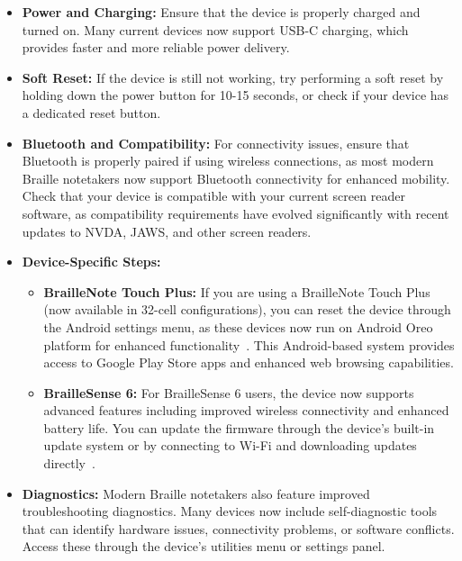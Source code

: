 \begin{itemize}
	\item \textbf{Power and Charging:} Ensure that the device is properly charged and turned on. Many current devices now support USB-C charging, which provides faster and more reliable power delivery.
	\item \textbf{Soft Reset:} If the device is still not working, try performing a soft reset by holding down the power button for 10-15 seconds, or check if your device has a dedicated reset button.
	\item \textbf{Bluetooth and Compatibility:} For connectivity issues, ensure that Bluetooth is properly paired if using wireless connections, as most modern Braille notetakers now support Bluetooth connectivity for enhanced mobility. Check that your device is compatible with your current screen reader software, as compatibility requirements have evolved significantly with recent updates to NVDA, JAWS, and other screen readers.
	\item \textbf{Device-Specific Steps:}
	      \begin{itemize}
		      \item \textbf{BrailleNote Touch Plus:} If you are using a BrailleNote Touch Plus (now available in 32-cell configurations), you can reset the device through the Android settings menu, as these devices now run on Android Oreo platform for enhanced functionality~\supercite{BrailleNoteTouchPlus32}. This Android-based system provides access to Google Play Store apps and enhanced web browsing capabilities.
		      \item \textbf{BrailleSense 6:} For BrailleSense 6 users, the device now supports advanced features including improved wireless connectivity and enhanced battery life. You can update the firmware through the device's built-in update system or by connecting to Wi-Fi and downloading updates directly~\supercite{BrailleSense6}.
	      \end{itemize}
	\item \textbf{Diagnostics:} Modern Braille notetakers also feature improved troubleshooting diagnostics. Many devices now include self-diagnostic tools that can identify hardware issues, connectivity problems, or software conflicts. Access these through the device's utilities menu or settings panel.
\end{itemize}

